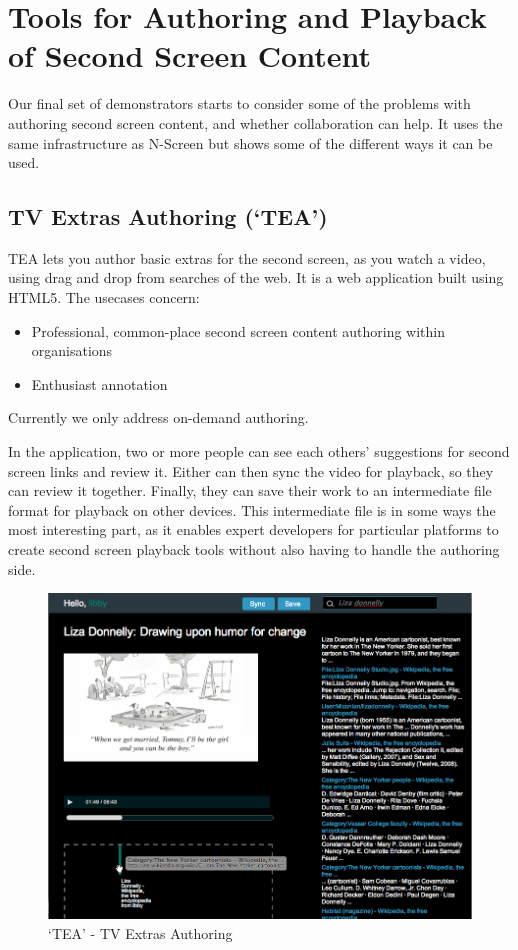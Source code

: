 \documentclass{notube}
\begin{document}
\section{Tools for Authoring and Playback of Second Screen Content}

Our final set of demonstrators starts to consider some of the problems with authoring second screen content, and whether collaboration can help. It uses the same infrastructure as N-Screen but shows some of the different ways it can be used.

\subsection{TV Extras Authoring (`TEA')}

TEA lets you author basic extras for the second screen, as you watch a video, using drag and drop from searches of the web. It is a web application built using HTML5. The usecases concern:

\begin{itemize}
\item{Professional, common-place second screen content authoring within organisations}
\item{Enthusiast annotation}
\end{itemize}

Currently we only address on-demand authoring. 

In the application, two or more people can see each others' suggestions for second screen links and review it. Either can then sync the video for playback, so they can review it together. Finally, they can save their work to an intermediate file format for playback on other devices. This intermediate file is in some ways the most interesting part, as it enables expert developers for particular platforms to create second screen playback tools without also having to handle the authoring side.

\begin{figure}[htbp]
\begin{center}
\includegraphics[width=6in]{images/tea.png}
\caption{`TEA' - TV Extras Authoring} \label{fig:tea}
\end{center}
\end{figure} 
\end{document}
